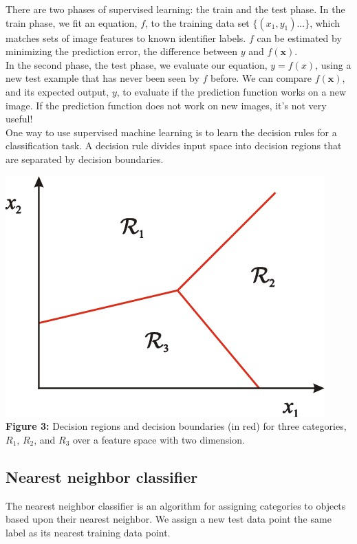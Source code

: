 \documentclass{article}
\begin{document}
There are two phases of supervised learning: the train and the test phase. In the train phase, we fit an equation, $f$, to the training data set $\{(x_1, y_1) ... \}$, which matches sets of image features to known identifier labels. $f$ can be estimated by minimizing the prediction error, the difference between $y$ and $f(\mathbf{x})$. \\

In the second phase, the test phase, we evaluate our equation, $y=f(x)$, using a new test example that has never been seen by $f$ before. We can compare $f(\mathbf{x})$, and its expected output, $y$, to evaluate if the prediction function works on a new image. If the prediction function does not work on new images, it's not very useful!\\

One way to use supervised machine learning is to learn the decision rules for a classification task.  A decision rule divides input space into decision regions that are separated by decision boundaries.

\begin{center}
	\includegraphics[scale=0.5]{decision_boudnaries.jpg}\\
    \textbf{Figure 3:} Decision regions and decision boundaries (in red) for three categories, $R_1$, $R_2$, and $R_3$ over a feature space with two dimension. \citeauthor{lecture11}\\
\end{center}

\subsection{Nearest neighbor classifier}
The nearest neighbor classifier is an algorithm for assigning categories to objects based upon their nearest neighbor. We assign a new test data point the same label as its nearest training data point.\\
\end{document}
